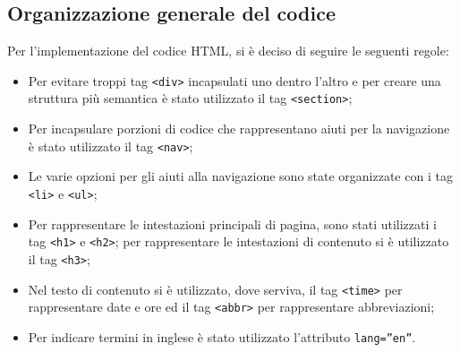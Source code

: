     \subsection{Organizzazione generale del codice}
    Per l'implementazione del codice HTML, si è deciso di seguire le seguenti regole:
    \begin{itemize}
        \item Per evitare troppi tag \texttt{<div>} incapsulati uno dentro l'altro e per creare una struttura più semantica è stato utilizzato il tag \texttt{<section>};
        \item Per incapsulare porzioni di codice che rappresentano aiuti per la navigazione è stato utilizzato il tag \texttt{<nav>};
        \item Le varie opzioni per gli aiuti alla navigazione sono state organizzate con i tag \texttt{<li>} e \texttt{<ul>};
        \item Per rappresentare le intestazioni principali di pagina, sono stati utilizzati i tag \texttt{<h1>} e \texttt{<h2>}; per rappresentare le intestazioni di contenuto si è utilizzato il tag \texttt{<h3>};
        \item Nel testo di contenuto si è utilizzato, dove serviva, il tag \texttt{<time>} per rappresentare date e ore ed il tag \texttt{<abbr>} per rappresentare abbreviazioni;
        \item Per indicare termini in inglese è stato utilizzato l'attributo \texttt{lang=”en”}.
    \end{itemize}
    
